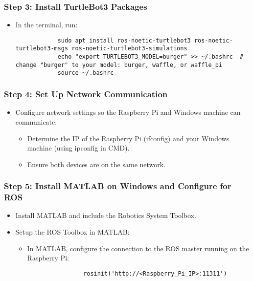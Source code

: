 \documentclass{article}
\begin{document}
	\subsubsection*{Step 3: Install TurtleBot3 Packages}
	\begin{itemize}
		\item In the terminal, run:
		\begin{verbatim}
			sudo apt install ros-noetic-turtlebot3 ros-noetic-turtlebot3-msgs ros-noetic-turtlebot3-simulations
			echo "export TURTLEBOT3_MODEL=burger" >> ~/.bashrc  # change "burger" to your model: burger, waffle, or waffle_pi
			source ~/.bashrc
		\end{verbatim}
	\end{itemize}
	\subsubsection*{Step 4: Set Up Network Communication}
	\begin{itemize}
		\item Configure network settings so the Raspberry Pi and Windows machine can communicate:
		\begin{itemize}
			\item Determine the IP of the Raspberry Pi (ifconfig) and your Windows machine (using ipconfig in CMD).
			\item Ensure both devices are on the same network.
		\end{itemize}
	\end{itemize}
	\subsubsection*{Step 5: Install MATLAB on Windows and Configure for ROS}
	\begin{itemize}
		\item Install MATLAB and include the Robotics System Toolbox.
		\item Setup the ROS Toolbox in MATLAB:
		\begin{itemize}
			\item In MATLAB, configure the connection to the ROS master running on the Raspberry Pi:
			\begin{verbatim}
				rosinit('http://<Raspberry_Pi_IP>:11311')
			\end{verbatim}
		\end{itemize}
	\end{itemize}
\end{document}
